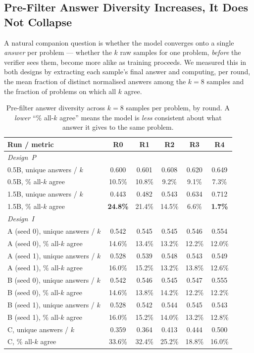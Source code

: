 \documentclass[runningheads]{llncs}
\begin{document}
\subsection{Pre-Filter Answer Diversity Increases, It Does Not Collapse}
\label{sec:answer-diversity}

A natural companion question is whether the model converges onto a single
\emph{answer} per problem --- whether the $k$ raw samples for one problem,
\emph{before} the verifier sees them, become more alike as training
proceeds. We measured this in both designs by extracting each sample's
final answer and computing, per round, the mean fraction of distinct
normalised answers among the $k=8$ samples and the fraction of problems on
which all $k$ agree.

\begin{table}[t]
\caption{Pre-filter answer diversity across $k{=}8$ samples per problem, by
round. A \emph{lower} ``\% all-$k$ agree'' means the model is \emph{less}
consistent about what answer it gives to the same problem.}
\label{tab:answer-diversity}
\centering
\begin{tabular}{lccccc}
\toprule
Run / metric & R0 & R1 & R2 & R3 & R4 \\
\midrule
\multicolumn{6}{l}{\emph{Design~P}} \\
0.5B, unique answers / $k$ & 0.600 & 0.601 & 0.608 & 0.620 & 0.649 \\
0.5B, \% all-$k$ agree & 10.5\% & 10.8\% & 9.2\% & 9.1\% & 7.3\% \\
1.5B, unique answers / $k$ & 0.443 & 0.482 & 0.543 & 0.634 & 0.712 \\
1.5B, \% all-$k$ agree & \textbf{24.8\%} & 21.4\% & 14.5\% & 6.6\% & \textbf{1.7\%} \\
\midrule
\multicolumn{6}{l}{\emph{Design~I}} \\
A (seed 0), unique answers / $k$ & 0.542 & 0.545 & 0.545 & 0.546 & 0.554 \\
A (seed 0), \% all-$k$ agree & 14.6\% & 13.4\% & 13.2\% & 12.2\% & 12.0\% \\
A (seed 1), unique answers / $k$ & 0.528 & 0.539 & 0.548 & 0.543 & 0.549 \\
A (seed 1), \% all-$k$ agree & 16.0\% & 15.2\% & 13.2\% & 13.8\% & 12.6\% \\
B (seed 0), unique answers / $k$ & 0.542 & 0.546 & 0.545 & 0.547 & 0.555 \\
B (seed 0), \% all-$k$ agree & 14.6\% & 13.8\% & 14.2\% & 12.2\% & 12.2\% \\
B (seed 1), unique answers / $k$ & 0.528 & 0.542 & 0.544 & 0.545 & 0.543 \\
B (seed 1), \% all-$k$ agree & 16.0\% & 15.2\% & 14.0\% & 13.2\% & 12.8\% \\
C, unique answers / $k$ & 0.359 & 0.364 & 0.413 & 0.444 & 0.500 \\
C, \% all-$k$ agree & 33.6\% & 32.4\% & 25.2\% & 18.8\% & 16.0\% \\
\bottomrule
\end{tabular}
\end{table}
\end{document}
